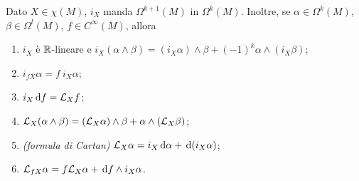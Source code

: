 \begin{theorem} \label{thm:ProprietaProdottoInterno}
	Dato $X\in\chi(M)$, $i_X$ manda $\Omega^{k+1}(M)$ in $\Omega^k(M)$. Inoltre, se $\alpha\in\Omega^k(M)$, $\beta\in\Omega^l(M)$, $f\in C^\infty(M)$, allora
	\begin{enumerate}
		\item $i_X$ è $\mathbb R$-lineare e $i_X(\alpha\wedge\beta) = (i_X\alpha)\wedge \beta + (-1)^k \alpha \wedge (i_X\beta)$; \label{ppi:Wedge}
		\item $i_{fX}\alpha = f\ i_X\alpha$; \label{ppi:Cinfinito}
		\item $i_X\,\mathrm d f = \mathcal L_X f$; \label{ppi:DeCinfinito}
		\item $\mathcal L_X(\alpha\wedge\beta) = (\mathcal L_X \alpha) \wedge \beta + \alpha \wedge (\mathcal L_X \beta)$; \label{ppi:LieWedge}
		\item \emph{(formula di Cartan)} $\mathcal L_X \alpha = i_X \,\mathrm d\alpha + \,\mathrm d( i_X\alpha)$; \label{ppi:DeForma} %
		\item $\mathcal L_{fX}\alpha = f\mathcal L_X\alpha + \,\mathrm d f \wedge i_X\alpha$. \label{ppi:LiePerCinfinito}
	\end{enumerate}
\end{theorem}
